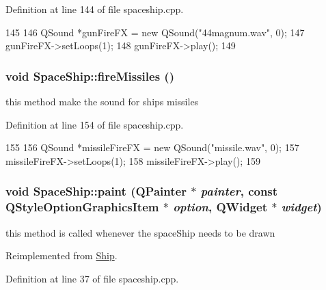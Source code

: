 Definition at line 144 of file spaceship.cpp.


\begin{DoxyCode}
145  {
146     QSound *gunFireFX = new QSound("44magnum.wav", 0);
147     gunFireFX->setLoops(1);
148     gunFireFX->play();
149 }
\end{DoxyCode}
\hypertarget{class_space_ship_a4fdfbd1a59a02df5897c2b37a49337c0}{
\subsubsection[{fireMissiles}]{\setlength{\rightskip}{0pt plus 5cm}void SpaceShip::fireMissiles ()}}
\label{class_space_ship_a4fdfbd1a59a02df5897c2b37a49337c0}
this method make the sound for ships missiles 

Definition at line 154 of file spaceship.cpp.


\begin{DoxyCode}
155 {
156     QSound *missileFireFX = new QSound("missile.wav", 0);
157     missileFireFX->setLoops(1);
158     missileFireFX->play();
159 }
\end{DoxyCode}
\hypertarget{class_space_ship_adfc89b9201d546c24ca0bd7b59b44d24}{
\subsubsection[{paint}]{\setlength{\rightskip}{0pt plus 5cm}void SpaceShip::paint (QPainter $\ast$ {\em painter}, \/  const QStyleOptionGraphicsItem $\ast$ {\em option}, \/  QWidget $\ast$ {\em widget})}}
\label{class_space_ship_adfc89b9201d546c24ca0bd7b59b44d24}
this method is called whenever the spaceShip needs to be drawn 

Reimplemented from \hyperlink{class_ship_a1dad980a3b84bb77c63da853ec13477d}{Ship}.

Definition at line 37 of file spaceship.cpp.


